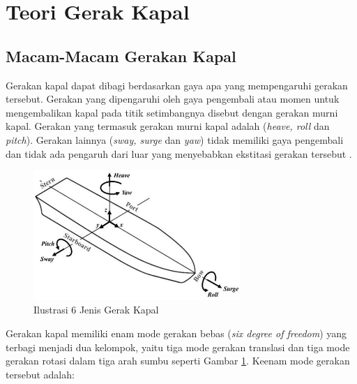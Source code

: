 \section{Teori Gerak Kapal}
\label{sec:teori-gerak-kapal}

\subsection{Macam-Macam Gerakan Kapal}
\label{subsec:macam-gerak-kapal}

Gerakan kapal dapat dibagi berdasarkan gaya apa yang mempengaruhi gerakan tersebut. Gerakan yang dipengaruhi oleh gaya pengembali atau momen untuk mengembalikan kapal pada titik setimbangnya disebut dengan gerakan murni kapal. Gerakan yang termasuk gerakan murni kapal adalah (\textit{heave, roll} dan \textit{pitch}). Gerakan lainnya (\textit{sway, surge} dan \textit{yaw}) tidak memiliki gaya pengembali dan tidak ada pengaruh dari luar yang menyebabkan ekstitasi gerakan tersebut \citep{Bhattacharyya_1978}.

\begin{figure}[!ht]
    \centering
    \includegraphics[width=0.7\textwidth]{gambar/vessel-degree-of-motion.jpeg}
    \caption{Ilustrasi 6 Jenis Gerak Kapal}
    \label{fig:6-derajat-gerak-kapal}
\end{figure}

Gerakan kapal memiliki enam mode gerakan bebas (\textit{six degree of freedom}) yang terbagi menjadi dua kelompok, yaitu tiga mode gerakan translasi dan tiga mode gerakan rotasi dalam tiga arah sumbu seperti Gambar \ref{fig:6-derajat-gerak-kapal}. Keenam mode gerakan tersebut adalah:

